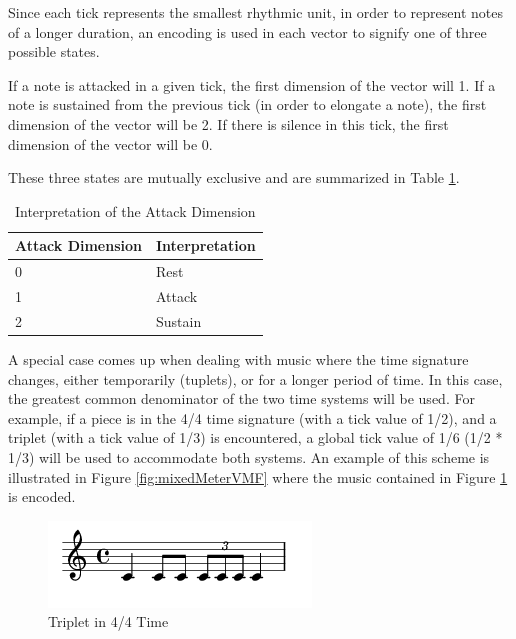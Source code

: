 Since each tick represents the smallest rhythmic unit, in order to represent notes of a longer duration, an encoding is used in each vector to signify one of three possible states.

If a note is attacked in a given tick, the first dimension of the vector will 1. If a note is sustained from the previous tick (in order to elongate a note), the first dimension of the vector will be 2. If there is silence in this tick, the first dimension of the vector will be 0.

These three states are mutually exclusive and are summarized in Table \ref{tab:attackBits}.

\begin{table}[ht]
  \centering
  \begin{tabular}{ll}
  Attack Dimension & Interpretation \\ \hline
  0          & Rest             \\
  1          & Attack              \\
  2          & Sustain           \\
  \end{tabular}
  \caption{Interpretation of the Attack Dimension}
  \label{tab:attackBits}
\end{table}

A special case comes up when dealing with music where the time signature changes, either temporarily (tuplets), or for a longer period of time. In this case, the greatest common denominator of the two time systems will be used. For example, if a piece is in the 4/4 time signature (with a tick value of 1/2), and a triplet (with a tick value of 1/3) is encountered, a global tick value of 1/6 (1/2 * 1/3) will be used to accommodate both systems. An example of this scheme is illustrated in Figure \ref{fig:mixedMeterVMF} where the music contained in Figure \ref{fig:mixedMeterWestern} is encoded.

\begin{figure}
  \begin{center}
    \includegraphics[scale=0.75]{lilypond/mixedMeter}
    \caption{Triplet in 4/4 Time}
    \label{fig:mixedMeterWestern}
  \end{center}
\end{figure}

